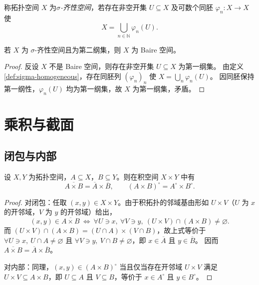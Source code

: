 \documentclass[lang=cn,a4paper,newtx,figureplace=section,tableplace=section]{elegantbook}
\begin{document}
\begin{definition}\label{def:sigma-homogeneous}
  称拓扑空间 $X$ 为\emph{$\sigma$-齐性空间}，若存在非空开集 $U\subseteq X$ 及可数个同胚 $\varphi_n:X\to X$ 使
  \[
    X=\bigcup_{n\in\mathbb N}\varphi_n(U).
  \]
\end{definition}

\begin{proposition}\label{prop:sigma-homogeneous-second-category-baire}
  若 $X$ 为 $\sigma$-齐性空间且为第二纲集，则 $X$ 为 Baire 空间。
\end{proposition}
\begin{proof}
  反设 $X$ 不是 Baire 空间，则存在非空开集 $U\subseteq X$ 为第一纲集。
  由定义 \ref{def:sigma-homogeneous}，存在同胚列 $(\varphi_n)_n$ 使 $X=\bigcup_n\varphi_n(U)$。
  因同胚保持第一纲性，$\varphi_n(U)$ 均为第一纲集，故 $X$ 为第一纲集，矛盾。
\end{proof}

\section{乘积与截面}

\subsection{闭包与内部}

\begin{proposition}\label{prop:product-closure-interior}
  设 $X,Y$ 为拓扑空间，$A\subseteq X$，$B\subseteq Y$。则在积空间 $X\times Y$ 中有
  \[
    \overline{A\times B}=\overline A\times\overline B,\qquad (A\times B)^\circ=A^\circ\times B^\circ.
  \]
\end{proposition}
\begin{proof}
  对闭包：任取 $(x,y)\in X\times Y$。由于积拓扑的邻域基由形如 $U\times V$（$U$ 为 $x$ 的开邻域，$V$ 为 $y$ 的开邻域）给出，
  \[
    (x,y)\in\overline{A\times B}\ \Leftrightarrow\ \forall U\ni x,\ \forall V\ni y,\ (U\times V)\cap(A\times B)\neq\varnothing.
  \]
  而 $(U\times V)\cap(A\times B)=(U\cap A)\times(V\cap B)$，故上式等价于 $\forall U\ni x,\ U\cap A\neq\varnothing$ 且 $\forall V\ni y,\ V\cap B\neq\varnothing$，即 $x\in\overline A$ 且 $y\in\overline B$。
  因而 $\overline{A\times B}=\overline A\times\overline B$。

  对内部：同理，$(x,y)\in(A\times B)^\circ$ 当且仅当存在开邻域 $U\times V$ 满足 $U\times V\subseteq A\times B$，即 $U\subseteq A$ 且 $V\subseteq B$，等价于 $x\in A^\circ$ 且 $y\in B^\circ$。
\end{proof}
\end{document}
